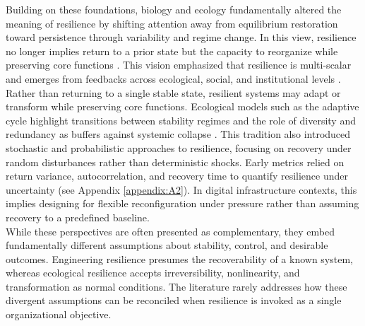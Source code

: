 Building on these foundations, biology and ecology fundamentally altered the meaning of resilience by shifting attention away from equilibrium restoration toward persistence through variability and regime change. In this view, resilience no longer implies return to a prior state but the capacity to reorganize while preserving core functions \autocite{holling1973resilience, gunderson2002panarchy}. This vision emphasized that resilience is multi-scalar and emerges from feedbacks across ecological, social, and institutional levels \autocite{sundstrom2014transdisciplinary}. Rather than returning to a single stable state, resilient systems may adapt or transform while preserving core functions. Ecological models such as the adaptive cycle highlight transitions between stability regimes and the role of diversity and redundancy as buffers against systemic collapse \autocite{walker2004resilience, folke2004regime, folke2010resilience}. This tradition also introduced stochastic and probabilistic approaches to resilience, focusing on recovery under random disturbances rather than deterministic shocks. Early metrics relied on return variance, autocorrelation, and recovery time to quantify resilience under uncertainty \autocite{ives1995measuring} (see Appendix \ref{appendix:A2}). In digital infrastructure contexts, this implies designing for flexible reconfiguration under pressure rather than assuming recovery to a predefined baseline.\\

While these perspectives are often presented as complementary, they embed fundamentally different assumptions about stability, control, and desirable outcomes. Engineering resilience presumes the recoverability of a known system, whereas ecological resilience accepts irreversibility, nonlinearity, and transformation as normal conditions. The literature rarely addresses how these divergent assumptions can be reconciled when resilience is invoked as a single organizational objective.\\

